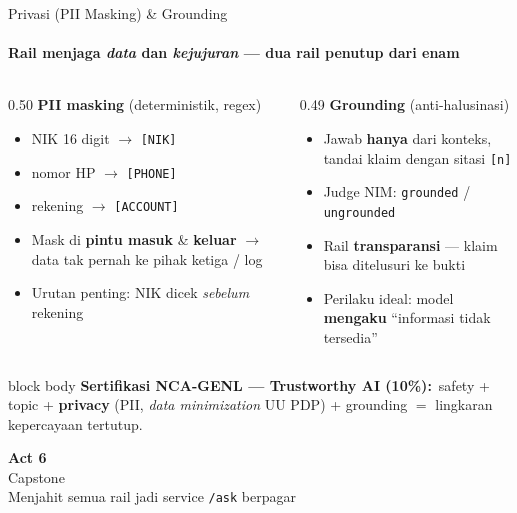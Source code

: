 \documentclass[aspectratio=169,t]{beamer}
\newcommand{\acttitle}[3]{%
  \begin{frame}[plain]
    \vspace{1.5cm}
    \begin{center}
      {\color{nvgreen}\Huge\bfseries Act #1}\\[1.2em]
      {\color{nvwhite}\Huge #2}\\[0.8em]
      {\color{nvgray}\Large #3}
    \end{center}
  \end{frame}%
}
\newcommand{\certnote}[2]{%
  \vspace{0.25em}
  \begin{beamercolorbox}[rounded=true,shadow=false,sep=5pt]{block body}
    {\scriptsize\color{nvblue}\textbf{Sertifikasi NCA-GENL --- #1:}}\,
    {\scriptsize\color{nvgray}#2}
  \end{beamercolorbox}%
}
\begin{document}
\begin{frame}{Privasi (PII Masking) \& Grounding}
  \framesubtitle{Rail menjaga \emph{data} dan \emph{kejujuran} --- dua rail penutup dari enam}
  \begin{columns}[T]
    \begin{column}{0.50\textwidth}
      \textcolor{nvgreen}{\textbf{PII masking}} (deterministik, regex)
      \begin{itemize}\footnotesize
        \item NIK 16 digit $\to$ \texttt{[NIK]}
        \item nomor HP $\to$ \texttt{[PHONE]}
        \item rekening $\to$ \texttt{[ACCOUNT]}
        \item Mask di \textbf{pintu masuk} \& \textbf{keluar} $\to$ data tak pernah ke pihak ketiga / log
        \item Urutan penting: NIK dicek \emph{sebelum} rekening
      \end{itemize}
    \end{column}
    \begin{column}{0.49\textwidth}
      \textcolor{nvblue}{\textbf{Grounding}} (anti-halusinasi)
      \begin{itemize}\footnotesize
        \item Jawab \textbf{hanya} dari konteks, tandai klaim dengan sitasi \texttt{[n]}
        \item Judge NIM: \texttt{grounded} / \texttt{ungrounded}
        \item Rail \textbf{transparansi} --- klaim bisa ditelusuri ke bukti
        \item Perilaku ideal: model \textbf{mengaku} ``informasi tidak tersedia''
      \end{itemize}
    \end{column}
  \end{columns}
  \certnote{Trustworthy AI (10\%)}{safety + topic + \textbf{privacy} (PII, \emph{data minimization} UU PDP) + grounding $=$ lingkaran kepercayaan tertutup.}
\end{frame}

\acttitle{6}{Capstone}{Menjahit semua rail jadi service \texttt{/ask} berpagar}
\end{document}
